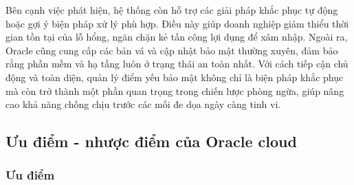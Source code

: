 \begin{myitem}
\begin{mysubitem}
        \item Bên cạnh việc phát hiện, hệ thống còn hỗ trợ các giải pháp khắc phục tự động hoặc gợi ý biện pháp xử lý phù hợp. Điều này giúp doanh nghiệp giảm thiểu thời gian tồn tại của lỗ hổng, ngăn chặn kẻ tấn công lợi dụng để xâm nhập. Ngoài ra, Oracle cũng cung cấp các bản vá và cập nhật bảo mật thường xuyên, đảm bảo rằng phần mềm và hạ tầng luôn ở trạng thái an toàn nhất. Với cách tiếp cận chủ động và toàn diện, quản lý điểm yếu bảo mật không chỉ là biện pháp khắc phục mà còn trở thành một phần quan trọng trong chiến lược phòng ngừa, giúp nâng cao khả năng chống chịu trước các mối đe dọa ngày càng tinh vi.
    \end{mysubitem}
    
\end{myitem}

\subsection{Ưu điểm - nhược điểm của Oracle cloud}
\subsubsection{Ưu điểm}

